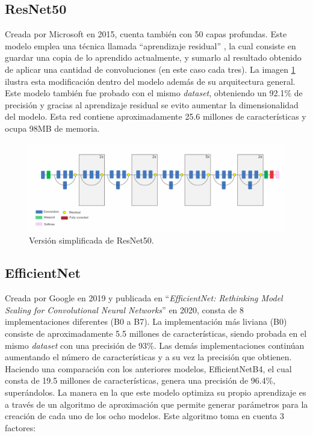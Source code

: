 \subsection{ResNet50}
Creada por Microsoft en 2015, cuenta también con 50 capas profundas. Este modelo emplea 
una técnica llamada ``aprendizaje residual'' \cite{He2015}, la cual consiste en guardar una 
copia de lo aprendido actualmente, y sumarlo al resultado obtenido de aplicar una cantidad de 
convoluciones (en este caso cada tres). La imagen \ref{ResNet} ilustra esta modificación dentro 
del modelo además de su arquitectura general. Este modelo también fue probado con el mismo 
\textit{dataset}, obteniendo un 92.1\% de precisión y gracias al aprendizaje residual se evito 
aumentar la dimensionalidad del modelo. Esta red contiene aproximadamente 25.6 millones de 
características y ocupa 98MB de memoria. 

\begin{figure}[h!]
\includegraphics[width=1\textwidth]{images/ResNet.png}
\centering
\caption{Versión simplificada de ResNet50. \protect\cite{modelos} }
\label{ResNet}
\end{figure}


\subsection{EfficientNet}

Creada por Google en 2019 y publicada en ``\textit{EfficientNet: Rethinking Model 
Scaling for Convolutional Neural Networks}'' \cite{Tan2020} en 2020, consta de 8 
implementaciones diferentes (B0 a B7). La implementación más liviana (B0) consiste 
de aproximadamente 5.5 millones de características, siendo probada en el mismo 
\textit{dataset} con una precisión de 93\%. Las demás implementaciones continúan 
aumentando el número de características y a su vez la precisión que obtienen. Haciendo 
una comparación con los anteriores modelos, EfficientNetB4, el cual consta de 19.5 
millones de características, genera una precisión de 96.4\%, superándolos. La manera 
en la que este modelo optimiza su propio aprendizaje es a través de un algoritmo de 
aproximación que permite generar parámetros para la creación de cada uno de los ocho 
modelos. Este algoritmo toma en cuenta 3 factores:

